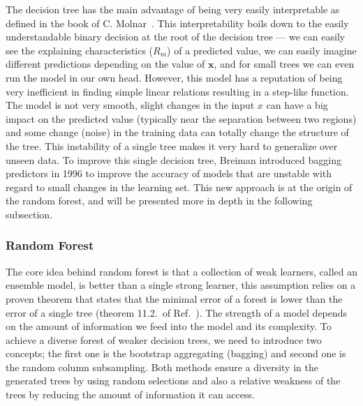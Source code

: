 \documentclass[main]{subfiles}
\begin{document}
The decision tree has the main advantage of being very easily interpretable as defined in the book of C. Molnar~\cite{molnar2020interpretable}. This interpretability boils down to the easily understandable binary decision at the root of the decision tree --- we can easily see the explaining characteristics ($R_m$) of a predicted value, we can easily imagine different predictions depending on the value of $\mathbf{x}$, and for small trees we can even run the model in our own head. However, this model has a reputation of being very inefficient in finding simple linear relations resulting in a step-like function. The model is not very smooth, slight changes in the input $x$ can have a big impact on the predicted value (typically near the separation between two regions) and some change (noise) in the training data can totally change the structure of the tree. This instability of a single tree makes it very hard to generalize over unseen data.\autocite{molnar2020interpretable} To improve this single decision tree, Breiman introduced bagging predictors in 1996 to improve the accuracy of models that are unstable with regard to small changes in the learning set.\autocite{Breiman_1996} This new approach is at the origin of the random forest, and will be presented more in depth in the following subsection.

\subsubsection{Random Forest}

The core idea behind random forest is that a collection of weak learners, called an ensemble model, is better than a single strong learner, this assumption relies on a proven theorem that states that the minimal error of a forest is lower than the error of a single tree (theorem 11.2.\ of Ref.~\cite{Breiman_2001}). The strength of a model depends on the amount of information we feed into the model and its complexity. To achieve a diverse forest of weaker decision trees, we need to introduce two concepts; the first one is the bootstrap aggregating (bagging) and second one is the random column subsampling. Both methods ensure a diversity in the generated trees by using random selections and also a relative weakness of the trees by reducing the amount of information it can access. 
\end{document}
